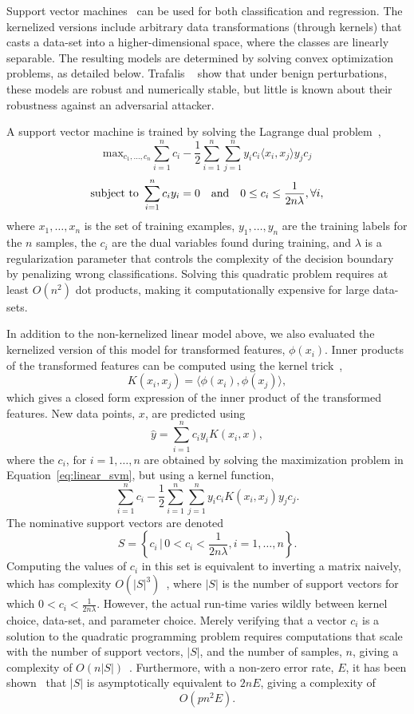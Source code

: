 \documentclass[fonts]{icst}
\begin{document}
Support vector machines~\cite{cortes1995support} can be used for both classification and regression.
The kernelized versions include arbitrary data transformations (through kernels) that casts a data-set into a higher-dimensional space, where the classes are linearly separable.
The resulting models are determined by solving convex optimization problems, as detailed below.
Trafalis ~\cite{trafalis2007robust} show that under benign perturbations, these models are robust and numerically stable, but little is known about their robustness against an adversarial attacker.

A support vector machine is trained by solving the Lagrange dual problem~\cite{cortes1995support},
\begin{equation}
    \textrm{max}_{c_1,\ldots,c_n}
    \sum_{i = 1}^n c_i - \frac{1}{2} \sum_{i = 1}^n \sum_{j = 1}^n y_i c_i \langle x_i, x_j \rangle y_j c_j
    \label{eq:linear_svm}
\end{equation}
$$
    \textrm{subject to } \sum_{i = 1}^n c_i y_i = 0 \textrm{\quad and\quad} 0 \leq c_i \leq \frac{1}{2n\lambda}, \forall i,
$$
where $x_1,\ldots,x_n$ is the set of training examples, $y_1,\ldots,y_n$ are the training labels for the $n$ samples, the $c_i$ are the dual variables found during training, and $\lambda$ is a regularization parameter that controls the complexity of the decision boundary by penalizing wrong classifications.
Solving this quadratic problem requires at least $O(n^2)$ dot products, making it computationally expensive for large data-sets.

In addition to the non-kernelized linear model above, we also evaluated the kernelized version of this model for transformed features, $\phi(x_i)$.
Inner products of the transformed features can be computed using the kernel trick~\cite{cortes1995support},
$$
    K(x_i, x_j) = \langle\phi(x_i), \phi(x_j)\rangle,
$$
which gives a closed form expression of the inner product of the transformed features.
New data points, $x$, are predicted using
$$
    \hat{y} = \sum_{i = 1}^n c_i y_i K(x_i, x),
$$
where the $c_i$, for $i=1,\ldots,n$ are obtained by solving the maximization problem in Equation~\ref{eq:linear_svm}, but using a kernel function,
$$
    \sum_{i = 1}^n c_i - \frac{1}{2} \sum_{i=1}^n \sum_{j = 1}^n y_i c_i K(x_i, x_j) y_j c_j.
$$
The nominative support vectors are denoted
$$
    S = \left\{c_i \,\big|\, 0 < c_i < \frac{1}{2n\lambda}, i=1,\ldots,n\right\}.
$$
Computing the values of $c_i$ in this set is equivalent to inverting a matrix naively, which has complexity $O(|S|^3)$~\cite{bordes2005fast}, where $|S|$ is the number of support vectors for which $0 < c_i < \frac{1}{2n\lambda}$.
However, the actual run-time varies wildly between kernel choice, data-set, and parameter choice.
Merely verifying that a vector $c_i$ is a solution to the quadratic programming problem requires computations that scale with the number of support vectors, $|S|$, and the number of samples, $n$, giving a complexity of $O(n|S|)$~\cite{mehmood2015svm}.
Furthermore, with a non-zero error rate, $E$, it has been shown~\cite{christmann2004robustness} that $|S|$ is asymptotically equivalent to $2nE$, giving a  complexity of
$$
    O(pn^2E).
$$
\end{document}
